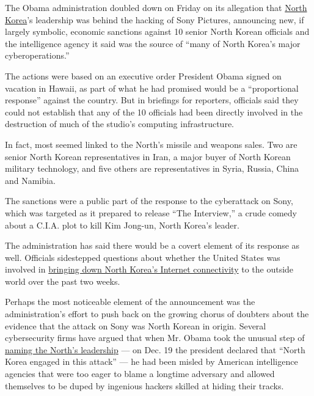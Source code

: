 The Obama administration doubled down on Friday on its allegation that
\href{http://topics.nytimes.com/top/news/international/countriesandterritories/northkorea/index.html?inline=nyt-geo}{North
Korea}'s leadership was behind the hacking of Sony Pictures, announcing
new, if largely symbolic, economic sanctions against 10 senior North
Korean officials and the intelligence agency it said was the source of
``many of North Korea's major cyberoperations.''

The actions were based on an executive order President Obama signed on
vacation in Hawaii, as part of what he had promised would be a
``proportional response'' against the country. But in briefings for
reporters, officials said they could not establish that any of the 10
officials had been directly involved in the destruction of much of the
studio's computing infrastructure.

In fact, most seemed linked to the North's missile and weapons sales.
Two are senior North Korean representatives in Iran, a major buyer of
North Korean military technology, and five others are representatives in
Syria, Russia, China and Namibia.

The sanctions were a public part of the response to the cyberattack on
Sony, which was targeted as it prepared to release ``The Interview,'' a
crude comedy about a C.I.A. plot to kill Kim Jong-un, North Korea's
leader.

The administration has said there would be a covert element of its
response as well. Officials sidestepped questions about whether the
United States was involved in
\href{https://www.nytimes.com/2014/12/28/world/asia/north-korea-sony-hacking-the-interview.html}{bringing
down North Korea's Internet connectivity} to the outside world over the
past two weeks.

Perhaps the most noticeable element of the announcement was the
administration's effort to push back on the growing chorus of doubters
about the evidence that the attack on Sony was North Korean in origin.
Several cybersecurity firms have argued that when Mr. Obama took the
unusual step of
\href{https://www.nytimes.com/2014/12/20/world/fbi-accuses-north-korean-government-in-cyberattack-on-sony-pictures.html}{naming
the North's leadership} --- on Dec. 19 the president declared that
``North Korea engaged in this attack'' --- he had been misled by
American intelligence agencies that were too eager to blame a longtime
adversary and allowed themselves to be duped by ingenious hackers
skilled at hiding their tracks.

